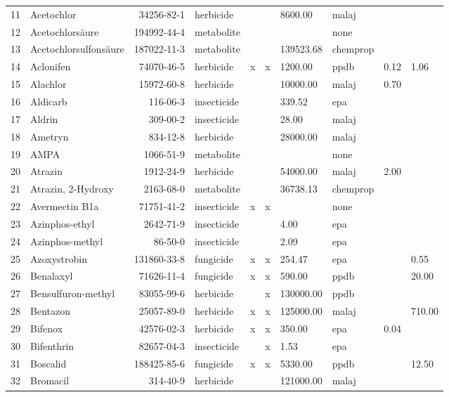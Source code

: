 \begin{longtable}{lp{3cm}rlp{0.5cm}p{0.5cm}p{1.5cm}p{1cm}p{1cm}p{1cm}}
  11 & Acetochlor & 34256-82-1 & herbicide &  &  & 8600.00 & malaj &  &  \\ 
  12 & Acetochlorsäure & 194992-44-4 & metabolite &  &  &  & none &  &  \\ 
  13 & Acetochlorsulfonsäure & 187022-11-3 & metabolite &  &  & 139523.68 & chemprop &  &  \\ 
  14 & Aclonifen & 74070-46-5 & herbicide & x & x & 1200.00 & ppdb & 0.12 & 1.06 \\ 
  15 & Alachlor & 15972-60-8 & herbicide &  &  & 10000.00 & malaj & 0.70 &  \\ 
  16 & Aldicarb & 116-06-3 & insecticide &  &  & 339.52 & epa &  &  \\ 
  17 & Aldrin & 309-00-2 & insecticide &  &  & 28.00 & malaj &  &  \\ 
  18 & Ametryn & 834-12-8 & herbicide &  &  & 28000.00 & malaj &  &  \\ 
  19 & AMPA & 1066-51-9 & metabolite &  &  &  & none &  &  \\ 
  20 & Atrazin & 1912-24-9 & herbicide &  &  & 54000.00 & malaj & 2.00 &  \\ 
  21 & Atrazin, 2-Hydroxy & 2163-68-0 & metabolite &  &  & 36738.13 & chemprop &  &  \\ 
  22 & Avermectin B1a & 71751-41-2 & insecticide & x & x &  & none &  &  \\ 
  23 & Azinphos-ethyl & 2642-71-9 & insecticide &  &  & 4.00 & epa &  &  \\ 
  24 & Azinphos-methyl & 86-50-0 & insecticide &  &  & 2.09 & epa &  &  \\ 
  25 & Azoxystrobin & 131860-33-8 & fungicide & x & x & 254.47 & epa &  & 0.55 \\ 
  26 & Benalaxyl & 71626-11-4 & fungicide & x & x & 590.00 & ppdb &  & 20.00 \\ 
  27 & Bensulfuron-methyl & 83055-99-6 & herbicide &  & x & 130000.00 & ppdb &  &  \\ 
  28 & Bentazon & 25057-89-0 & herbicide & x & x & 125000.00 & malaj &  & 710.00 \\ 
  29 & Bifenox & 42576-02-3 & herbicide & x & x & 350.00 & epa & 0.04 &  \\ 
  30 & Bifenthrin & 82657-04-3 & insecticide &  & x & 1.53 & epa &  &  \\ 
  31 & Boscalid & 188425-85-6 & fungicide & x & x & 5330.00 & ppdb &  & 12.50 \\ 
  32 & Bromacil & 314-40-9 & herbicide &  &  & 121000.00 & malaj &  &  \\ 

\end{longtable}
